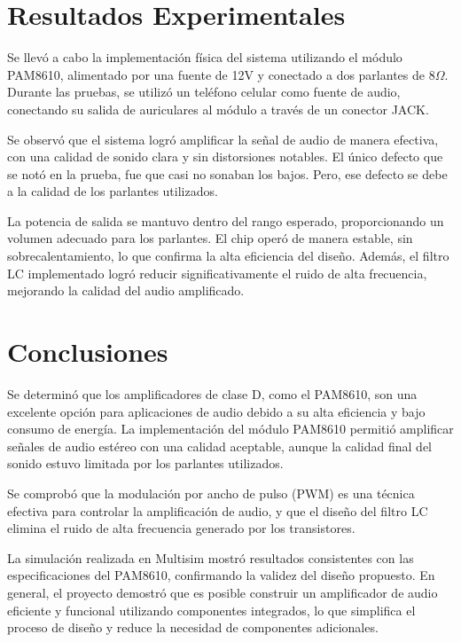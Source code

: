 \documentclass[journal, onecolumn]{IEEEtran}
\begin{document}
\section{Resultados Experimentales}

Se llevó a cabo la implementación física del sistema utilizando el módulo PAM8610, alimentado por una fuente de 12V y conectado a dos parlantes de $8\Omega$. Durante las pruebas, se utilizó un teléfono celular como fuente de audio, conectando su salida de auriculares al módulo a través de un conector JACK.

Se observó que el sistema logró amplificar la señal de audio de manera efectiva, con una calidad de sonido clara y sin distorsiones notables. El único defecto que se notó en la prueba, fue que casi no sonaban los bajos. Pero, ese defecto se debe a la calidad de los parlantes utilizados. 

La potencia de salida se mantuvo dentro del rango esperado, proporcionando un volumen adecuado para los parlantes. El chip operó de manera estable, sin sobrecalentamiento, lo que confirma la alta eficiencia del diseño. Además, el filtro LC implementado logró reducir significativamente el ruido de alta frecuencia, mejorando la calidad del audio amplificado.



\section{Conclusiones}

Se determinó que los amplificadores de clase D, como el PAM8610, son una excelente opción para aplicaciones de audio debido a su alta eficiencia y bajo consumo de energía. La implementación del módulo PAM8610 permitió amplificar señales de audio estéreo con una calidad aceptable, aunque la calidad final del sonido estuvo limitada por los parlantes utilizados.

Se comprobó que la modulación por ancho de pulso (PWM) es una técnica efectiva para controlar la amplificación de audio, y que el diseño del filtro LC elimina el ruido de alta frecuencia generado por los transistores. 

La simulación realizada en Multisim mostró resultados consistentes con las especificaciones del PAM8610, confirmando la validez del diseño propuesto. En general, el proyecto demostró que es posible construir un amplificador de audio eficiente y funcional utilizando componentes integrados, lo que simplifica el proceso de diseño y reduce la necesidad de componentes adicionales.
\end{document}
